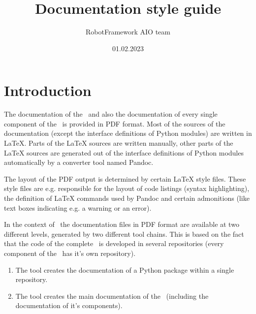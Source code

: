 \documentclass[a4paper,10pt]{report}
\author{RobotFramework AIO team}
\title{Documentation style guide}
\date{01.02.2023}
\begin{document}
\hypersetup{pageanchor=false}

\maketitle

\clearpage
{}
\tableofcontents

\clearpage
{}

\hypersetup{pageanchor=true}


\chapter{Introduction}

The documentation of the \rfw\ and also the documentation of every single component of the \rfw\ is provided in PDF format.
Most of the sources of the documentation (except the interface definitions of Python modules) are written in LaTeX.
Parts of the LaTeX sources are written manually, other parts of the LaTeX sources are generated out of the interface definitions of Python modules
automatically by a converter tool named Pandoc.

The layout of the PDF output is determined by certain LaTeX style files. These style files are e.g. responsible for the layout of code listings (syntax highlighting),
the definition of LaTeX commands used by Pandoc and certain admonitions (like text boxes indicating e.g. a warning or an error).

In the context of \rfw\ the documentation files in PDF format are available at two different levels, generated by two different tool chains. This is based on the
fact that the code of the complete \rfw\ is developed in several repositories (every component of the \rfw\ has it's own repository).

\begin{enumerate}

   \item The tool  creates the documentation of a Python package within a single repository.

   \item The tool  creates the main documentation of the \rfw\ (including the documentation of it's components).

\end{enumerate}
\end{document}
